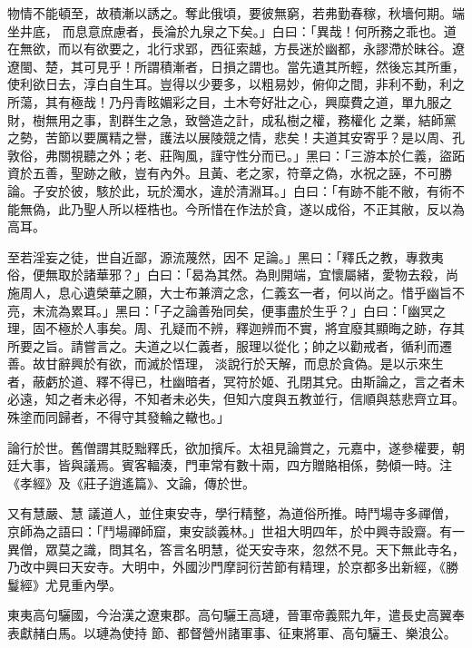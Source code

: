 \begin{pinyinscope}
 物情不能頓至，故積漸以誘之。奪此俄頃，要彼無窮，若弗勤春稼，秋墻何期。端坐井底，
 而息意庶慮者，長淪於九泉之下矣。」白曰：「異哉！何所務之乖也。道在無欲，而以有欲要之，北行求郢，西征索越，方長迷於幽都，永謬滯於昧谷。遼遼閩、楚，其可見乎！所謂積漸者，日損之謂也。當先遺其所輕，然後忘其所重，使利欲日去，淳白自生耳。豈得以少要多，以粗易妙，俯仰之間，非利不動，利之所蕩，其有極哉！乃丹青眩媚彩之目，土木夸好壯之心，興糜費之道，單九服之財，樹無用之事，割群生之急，致營造之計，成私樹之權，務權化
 之業，結師黨之勢，苦節以要厲精之譽，護法以展陵競之情，悲矣！夫道其安寄乎？是以周、孔敦俗，弗關視聽之外；老、莊陶風，謹守性分而已。」黑曰：「三游本於仁義，盜跖資於五善，聖跡之敝，豈有內外。且黃、老之家，符章之偽，水祝之誣，不可勝論。子安於彼，駭於此，玩於濁水，違於清淵耳。」白曰：「有跡不能不敝，有術不能無偽，此乃聖人所以桎梏也。今所惜在作法於貪，遂以成俗，不正其敝，反以為高耳。



 至若淫妄之徒，世自近鄙，源流蔑然，因不
 足論。」黑曰：「釋氏之教，專救夷俗，便無取於諸華邪？」白曰：「曷為其然。為則開端，宜懷屬緒，愛物去殺，尚施周人，息心遺榮華之願，大士布兼濟之念，仁義玄一者，何以尚之。惜乎幽旨不亮，末流為累耳。」黑曰：「子之論善殆同矣，便事盡於生乎？」白曰：「幽冥之理，固不極於人事矣。周、孔疑而不辨，釋迦辨而不實，將宜廢其顯晦之跡，存其所要之旨。請嘗言之。夫道之以仁義者，服理以從化；帥之以勸戒者，循利而遷善。故甘辭興於有欲，而滅於悟理，
 淡說行於天解，而息於貪偽。是以示來生者，蔽虧於道、釋不得已，杜幽暗者，冥符於姬、孔閉其兌。由斯論之，言之者未必遠，知之者未必得，不知者未必失，但知六度與五教並行，信順與慈悲齊立耳。殊塗而同歸者，不得守其發輪之轍也。」



 論行於世。舊僧謂其貶黜釋氏，欲加擯斥。太祖見論賞之，元嘉中，遂參權要，朝廷大事，皆與議焉。賓客輻湊，門車常有數十兩，四方贈賂相係，勢傾一時。注《孝經》及《莊子逍遙篇》、文論，傳於世。



 又有慧嚴、慧
 議道人，並住東安寺，學行精整，為道俗所推。時鬥場寺多禪僧，京師為之語曰：「鬥場禪師窟，東安談義林。」世祖大明四年，於中興寺設齋。有一異僧，眾莫之識，問其名，答言名明慧，從天安寺來，忽然不見。天下無此寺名，乃改中興曰天安寺。大明中，外國沙門摩訶衍苦節有精理，於京都多出新經，《勝鬘經》尤見重內學。



 東夷高句驪國，今治漢之遼東郡。高句驪王高璉，晉軍帝義熙九年，遣長史高翼奉表獻赭白馬。以璉為使持
 節、都督營州諸軍事、征東將軍、高句驪王、樂浪公。




\end{pinyinscope}
